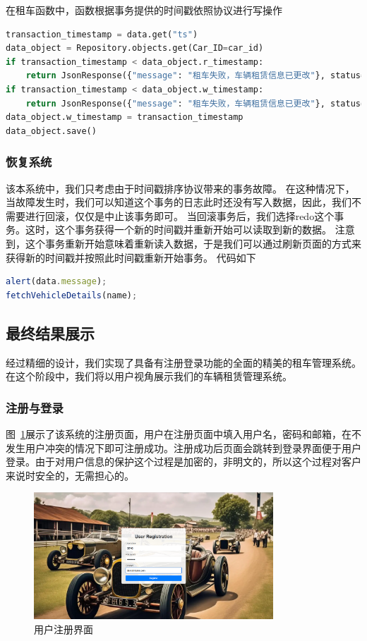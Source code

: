 \documentclass[UTF8,a4paper,12pt]{ctexart}
\begin{document}
在租车函数中，函数根据事务提供的时间戳依照协议进行写操作
\begin{lstlisting}[language=Python]
transaction_timestamp = data.get("ts")  
data_object = Repository.objects.get(Car_ID=car_id)
if transaction_timestamp < data_object.r_timestamp:
    return JsonResponse({"message": "租车失败，车辆租赁信息已更改"}, status=409)
if transaction_timestamp < data_object.w_timestamp:
    return JsonResponse({"message": "租车失败，车辆租赁信息已更改"}, status=409)
data_object.w_timestamp = transaction_timestamp
data_object.save()
\end{lstlisting}

\subsubsection{恢复系统}
该本系统中，我们只考虑由于时间戳排序协议带来的事务故障。 在这种情况下，当故障发生时，我们可以知道这个事务的日志此时还没有写入数据，因此，我们不需要进行回滚，仅仅是中止该事务即可。
当回滚事务后，我们选择redo这个事务。这时，这个事务获得一个新的时间戳并重新开始可以读取到新的数据。
注意到，这个事务重新开始意味着重新读入数据，于是我们可以通过刷新页面的方式来获得新的时间戳并按照此时间戳重新开始事务。
代码如下
\begin{lstlisting}[language=JavaScript]
alert(data.message); 
fetchVehicleDetails(name); 
\end{lstlisting}

\subsection{最终结果展示}
经过精细的设计，我们实现了具备有注册登录功能的全面的精美的租车管理系统。在这个阶段中，我们将以用户视角展示我们的车辆租赁管理系统。
\subsubsection{注册与登录}
图~\ref{fig:reg}展示了该系统的注册页面，用户在注册页面中填入用户名，密码和邮箱，在不发生用户冲突的情况下即可注册成功。注册成功后页面会跳转到登录界面便于用户登录。由于对用户信息的保护这个过程是加密的，非明文的，所以这个过程对客户来说时安全的，无需担心的。
\begin{figure}[htbp]  %
    \centering  %
    \includegraphics[width=0.8\textwidth]{pic/reg.png}
    \caption{用户注册界面}  %
    \label{fig:reg}  %
\end{figure}
\end{document}
